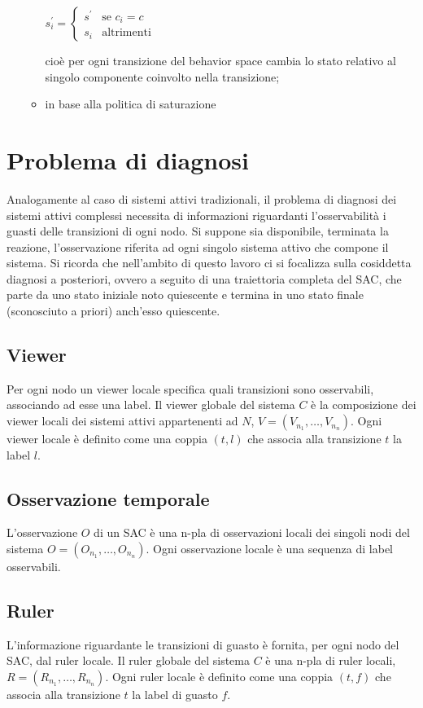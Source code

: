 \begin{defn}
\begin{enumerate}
\begin{itemize}
\begin{center}
$s^\prime_i = \begin{cases} s^\prime & \mbox{se }c_i = c\\ s_i & \mbox{altrimenti} \end{cases}$
\end{center}
cioè per ogni transizione del behavior space cambia lo stato relativo al singolo componente coinvolto nella transizione;
\item in base alla politica di saturazione
\end{itemize}
\end{enumerate}
\end{defn}


\newpage
\section{Problema di diagnosi}
Analogamente al caso di sistemi attivi tradizionali, il problema di diagnosi dei sistemi attivi complessi necessita di informazioni riguardanti l'osservabilità  i guasti delle transizioni di ogni nodo. Si suppone sia disponibile, terminata la reazione, l'osservazione riferita ad ogni singolo sistema attivo che compone il sistema. Si ricorda che nell'ambito di questo lavoro ci si focalizza sulla cosiddetta diagnosi a posteriori, ovvero a seguito di una traiettoria completa del SAC, che parte da uno stato iniziale noto quiescente e termina in uno stato finale (sconosciuto a priori) anch'esso quiescente. 

\subsection{Viewer}
Per ogni nodo un viewer locale specifica quali transizioni sono osservabili, associando ad esse una label. Il viewer globale del sistema $C$ è la composizione dei viewer locali dei sistemi attivi appartenenti ad $N$, $V = (V_{n_1}, \ldots, V_{n_n})$. Ogni viewer locale è definito come una coppia $(t,l)$ che associa alla transizione $t$ la label $l$.

\subsection{Osservazione temporale}
L'osservazione $O$ di un SAC è una n-pla di osservazioni locali dei singoli nodi del sistema $O = (O_{n_1}, \ldots, O_{n_n})$. Ogni osservazione locale è una sequenza di label osservabili.

\subsection{Ruler}
L'informazione riguardante le transizioni di guasto è fornita, per ogni nodo del SAC, dal ruler locale. Il ruler globale del sistema $C$ è una n-pla di ruler locali, $R = (R_{n_1}, \ldots, R_{n_n})$. Ogni ruler locale è definito come una coppia $(t,f)$ che associa alla transizione $t$ la label di guasto $f$.

